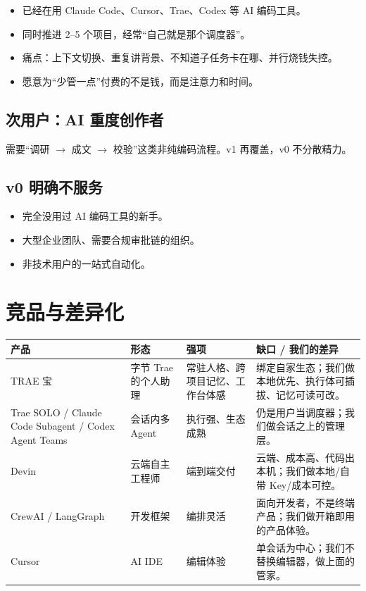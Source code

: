 \documentclass[UTF8,11pt,a4paper,fontset=windows]{ctexart}
\let\ocsection\section
\renewcommand{\section}{\Needspace{8\baselineskip}\ocsection}
\let\ocsubsection\subsection
\renewcommand{\subsection}{\Needspace{5\baselineskip}\ocsubsection}
\begin{document}
\begin{itemize}
  \item 已经在用 Claude Code、Cursor、Trae、Codex 等 AI 编码工具。
  \item 同时推进 2--5 个项目，经常“自己就是那个调度器”。
  \item 痛点：上下文切换、重复讲背景、不知道子任务卡在哪、并行烧钱失控。
  \item 愿意为“少管一点”付费的不是钱，而是注意力和时间。
\end{itemize}

\subsection{次用户：AI 重度创作者}

需要“调研 $\rightarrow$ 成文 $\rightarrow$ 校验”这类非纯编码流程。v1 再覆盖，v0 不分散精力。

\subsection{v0 明确不服务}

\begin{itemize}
  \item 完全没用过 AI 编码工具的新手。
  \item 大型企业团队、需要合规审批链的组织。
  \item 非技术用户的一站式自动化。
\end{itemize}

\section{竞品与差异化}

\noindent\begin{minipage}{\linewidth}
\centering
{}
\small
\begin{tabularx}{\linewidth}{@{}p{2.6cm} p{2.8cm} X X@{}}
\toprule
\textbf{产品} & \textbf{形态} & \textbf{强项} & \textbf{缺口 / 我们的差异} \\
\midrule
TRAE 宝 & 字节 Trae 的个人助理 & 常驻人格、跨项目记忆、工作台体感 & 绑定自家生态；我们做本地优先、执行体可插拔、记忆可读可改。 \\
Trae SOLO / Claude Code Subagent / Codex Agent Teams & 会话内多 Agent & 执行强、生态成熟 & 仍是用户当调度器；我们做会话之上的管理层。 \\
Devin & 云端自主工程师 & 端到端交付 & 云端、成本高、代码出本机；我们做本地/自带 Key/成本可控。 \\
CrewAI / LangGraph & 开发框架 & 编排灵活 & 面向开发者，不是终端产品；我们做开箱即用的产品体验。 \\
Cursor & AI IDE & 编辑体验 & 单会话为中心；我们不替换编辑器，做上面的管家。 \\
\bottomrule
\end{tabularx}
\end{minipage}
\end{document}

